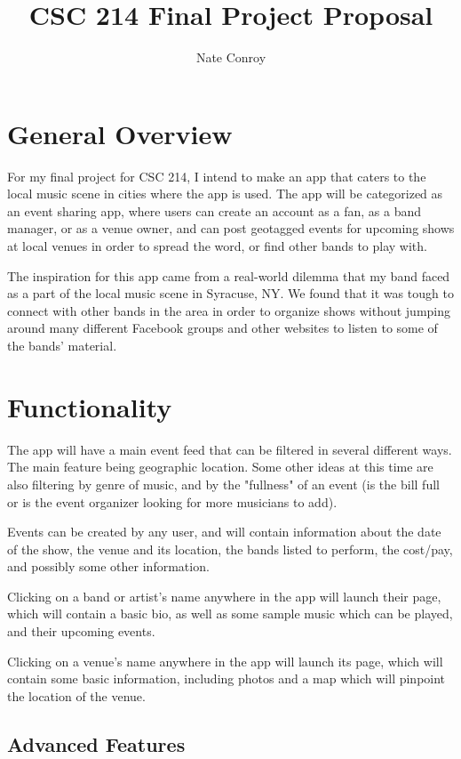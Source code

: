 \documentclass[a4paper]{article}
\title{CSC 214 Final Project Proposal}
\author{Nate Conroy}
\begin{document}
\maketitle

\section{General Overview}

For my final project for CSC 214, I intend to make an app that caters to the local music scene in cities where the app is used. The app will be categorized as an event sharing app, where users can create an account as a fan, as a band manager, or as a venue owner, and can post geotagged events for upcoming shows at local venues in order to spread the word, or find other bands to play with.

The inspiration for this app came from a real-world dilemma that my band faced as a part of the local music scene in Syracuse, NY. We found that it was tough to connect with other bands in the area in order to organize shows without jumping around many different Facebook groups and other websites to listen to some of the bands' material.

\section{Functionality}

The app will have a main event feed that can be filtered in several different ways. The main feature being geographic location. Some other ideas at this time are also filtering by genre of music, and by the "fullness" of an event (is the bill full or is the event organizer looking for more musicians to add).

Events can be created by any user, and will contain information about the date of the show, the venue and its location, the bands listed to perform, the cost/pay, and possibly some other information.

Clicking on a band or artist's name anywhere in the app will launch their page, which will contain a basic bio, as well as some sample music which can be played, and their upcoming events.

Clicking on a venue's name anywhere in the app will launch its page, which will contain some basic information, including photos and a map which will pinpoint the location of the venue.

\subsection{Advanced Features}
\end{document}
